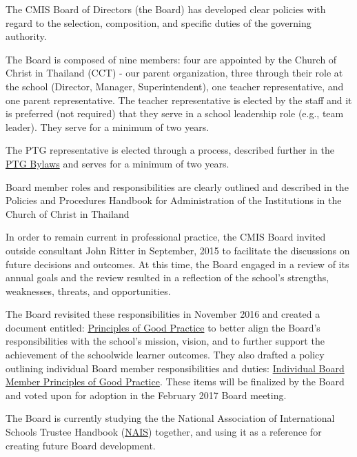 \begin{findings}
The CMIS Board of Directors (the Board) has developed clear policies with regard to the selection, composition, and specific duties of the governing authority. 

The Board is composed of nine members: four are appointed by the Church of Christ in Thailand (CCT) - our parent organization, three through their role at the school (Director, Manager, Superintendent), one teacher representative, and one parent representative. The teacher representative is elected by the staff and it is preferred (not required) that they serve in a school leadership role (e.g., team leader). They serve for a minimum of two years.

The PTG representative is elected through a process, described further in the \href{http://blogs.cmis.ac.th/ptg/bylaws/}{PTG Bylaws} and serves for a minimum of two years.

Board member roles and responsibilities are clearly outlined and described in the Policies and Procedures Handbook for Administration of the Institutions in the Church of Christ in Thailand

In order to remain current in professional practice, the CMIS Board invited outside consultant John Ritter in September, 2015 to facilitate the discussions on future decisions and outcomes. At this time, the Board engaged in a review of its annual goals and the review resulted in a reflection of the school's strengths, weaknesses, threats, and opportunities. 

The Board revisited these responsibilities in November 2016 and created a document entitled:  \href{https://docs.google.com/document/d/1EyIeD5g0RDANtZzH5rsCkvDp5ea_bQ2G9rWnhz4QbSc/edit?ts=5881d18d}{Principles of Good Practice}  to better align the Board’s responsibilities with the school’s mission, vision, and to further support the achievement of the schoolwide learner outcomes. They also drafted a policy outlining individual Board member responsibilities and duties: \href{https://docs.google.com/document/d/14e90Qr4edga9mEZuHIclWeraZ5jgq052IUwcnxTHQZw/edit?ts=5881b471}{Individual Board Member Principles of Good Practice}. These items will be finalized by the Board and voted upon for adoption in the February 2017 Board meeting.

The Board is currently studying the the National Association of International Schools Trustee Handbook (\href{http://www.nais.org/Articles/Pages/NAIS-Trustee-Handbook-Resources.aspx}{NAIS}) together, and using it as a reference for creating future Board development.


\end{findings}
